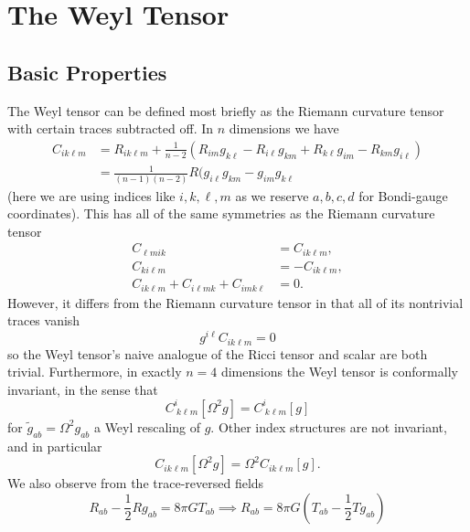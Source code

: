 \documentclass[11pt,letterpaper]{article}
\newcommand{\LP}{\left(}
\newcommand{\RP}{\right)}
\begin{document}
\section{The Weyl Tensor}

\subsection{Basic Properties}
The Weyl tensor can be defined most briefly as the Riemann curvature tensor with certain traces subtracted off. In $n$ dimensions we have \begin{equation}
\begin{aligned}
C_{i k \ell m} & = R_{i k \ell m} + \frac{1}{n-2} (R_{i m} g_{k \ell} - R_{i \ell} g_{k m} + R_{k \ell} g_{i m} - R_{k m} g_{i \ell} ) \\
& = \frac{1}{(n-1)(n-2)} R (g_{i \ell} g_{k m} - g_{i m} g_{k \ell}
\end{aligned}
\end{equation}
(here we are using indices like $i,k,\ell,m$ as we reserve $a,b,c,d$ for Bondi-gauge coordinates). This has all of the same symmetries as the Riemann curvature tensor \begin{equation}
\begin{aligned}
C_{\ell m i k} & = C_{i k \ell m}, \\
C_{k i \ell m} & = - C_{i k \ell m}, \\
C_{i k \ell m} + C_{i \ell m k} + C_{i m k \ell} & = 0.
\end{aligned}
\end{equation}
However, it differs from the Riemann curvature tensor in that all of its nontrivial traces vanish \begin{equation}
g^{i \ell} C_{i k \ell m} = 0
\end{equation}
so the Weyl tensor's naive analogue of the Ricci tensor and scalar are both trivial. Furthermore, in exactly $n = 4$ dimensions the Weyl tensor is conformally invariant, in the sense that \begin{equation}
C^i_{ \ k \ell m}[\Omega^2 g] = C^i_{ \ k \ell m}[g]
\end{equation}
for $\tilde{g}_{ab} = \Omega^2 g_{ab}$ a Weyl rescaling of $g$. Other index structures are not invariant, and in particular \begin{equation}
C_{i k \ell m}[\Omega^2 g] = \Omega^2 C_{i k \ell m} [g] .
\end{equation}
We also observe from the trace-reversed fields \begin{equation}
R_{ab} - \frac{1}{2} R g_{ab} = 8 \pi G T_{ab} \implies R_{ab} = 8 \pi G \LP T_{ab} - \frac{1}{2} T g_{ab} \RP
\end{equation}
\end{document}
